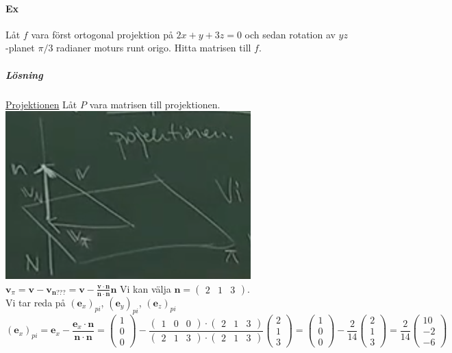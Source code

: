 \clearpage
\paragraph{Ex} Låt $f$ vara först ortogonal projektion på $2x+y+3z=0$ och sedan rotation av $yz$-planet $\pi/3$ radianer moturs runt origo.
Hitta matrisen till $f$.
\subparagraph{Lösning} \underline{Projektionen} Låt $P$ vara matrisen till projektionen.\\

\includegraphics[scale=0.5]{imgs/img01.png}\\

$\bm{v}_{\pi}=\bm{v}-\bm{v}_{\bm{n}???}=\bm{v}-\frac{\bm{v}\cdot \bm{n}}{\bm{n} \cdot \bm{n}}\bm{n}$
Vi kan välja $\bm{n}=\begin{pmatrix}2&1&3\end{pmatrix}$.\\
Vi tar reda på $(\bm{e}_{x})_{pi}$, $(\bm{e}_{y})_{pi}$, $(\bm{e}_{z})_{pi}$
\begin{equation*}
    (\bm{e}_{x})_{pi}=
    \bm{e}_{x}-\frac{\bm{e}_{x}\cdot \bm{n}}{\bm{n}\cdot \bm{n}}=
    \begin{pmatrix}1\\0\\0\end{pmatrix}-\frac{\begin{pmatrix}1&0&0\end{pmatrix}\cdot \begin{pmatrix}2&1&3\end{pmatrix}}{\begin{pmatrix}2&1&3\end{pmatrix}\cdot \begin{pmatrix}2&1&3\end{pmatrix}}\begin{pmatrix}2\\1\\3\end{pmatrix}=
    \begin{pmatrix}1\\0\\0\end{pmatrix}-\frac{2}{14}\begin{pmatrix}2\\1\\3\end{pmatrix}=
    \frac{2}{14}\begin{pmatrix}10\\-2\\-6\end{pmatrix}
\end{equation*}

